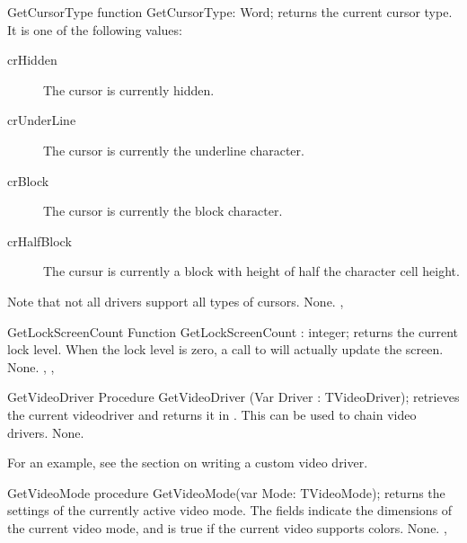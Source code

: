 \begin{function}{GetCursorType}
\Declaration
function GetCursorType: Word; 
\Description
{} returns the current cursor type. It is one of the
following values: 
\begin{description}
\item[crHidden] The cursor is currently hidden.
\item[crUnderLine] The cursor is currently the underline character.
\item[crBlock] The cursor is currently the block character.
\item[crHalfBlock] The cursur is currently a block with height of half the
character cell height.
\end{description}
Note that not all drivers support all types of cursors.
\Errors
None.
\SeeAlso
{}, 
\end{function}


\begin{function}{GetLockScreenCount}
\Declaration
Function GetLockScreenCount : integer;
\Description
{} returns the current lock level. When the lock
level is zero, a call to  will actually update the
screen.
\Errors
None.
\SeeAlso
{}, , 
\end{function}


\begin{procedure}{GetVideoDriver}
\Declaration
Procedure GetVideoDriver (Var Driver : TVideoDriver);
\Declaration
{} retrieves the current videodriver and returns it in
. This can be used to chain video drivers.
\Errors
None.
\SeeAlso
{}
\end{procedure}

For an example, see the section on writing a custom video driver.

\begin{procedure}{GetVideoMode}
\Declaration
procedure GetVideoMode(var Mode: TVideoMode); 
\Description
{} returns the settings of the currently active video mode.
The  fields indicate the dimensions of the current video mode,
and  is true if the current video supports colors.
\Errors
None.
\SeeAlso
{}, 
\end{procedure}


